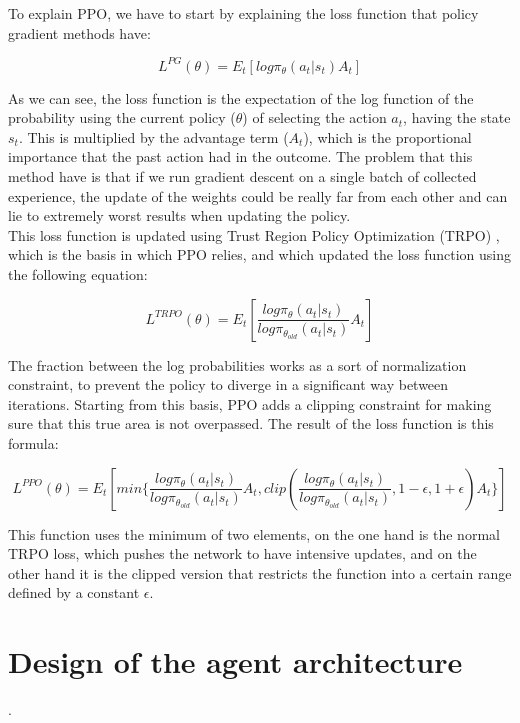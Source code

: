 \documentclass[12pt]{article}
\begin{document}
To explain PPO, we have to start by explaining the loss function that policy gradient methods have:

\begin{equation}
    L^{PG}(\theta) = E_t[log\pi_{\theta}(a_t|s_t)A_t]
\end{equation}

As we can see, the loss function is the expectation of the log function of the probability using the current policy ($\theta$) of selecting the action $a_t$, having the state $s_t$. This is multiplied by the advantage term ($A_t$), which is the proportional importance that the past action had in the outcome. The problem that this method have is that if we run gradient descent on a single batch of collected experience, the update of the weights could be really far from each other and can lie to extremely worst results when updating the policy. \\

This loss function is updated using Trust Region Policy Optimization (TRPO) \cite{schulman2015trust}, which is the basis in which PPO relies, and which updated the loss function using the following equation:

\begin{equation}
    L^{TRPO}(\theta) = E_t[\frac{log\pi_{\theta}(a_t|s_t)}{log\pi_{\theta_{old}}(a_t|s_t)}A_t]
    \label{ppo-loss}
\end{equation}

The fraction between the log probabilities works as a sort of normalization constraint, to prevent the policy to diverge in a significant way between iterations. Starting from this basis, PPO adds a clipping constraint for making sure that this true area is not overpassed. The result of the loss function is this formula:

\begin{equation}
    L^{PPO}(\theta) = E_t[min\{\frac{log\pi_{\theta}(a_t|s_t)}{log\pi_{\theta_{old}}(a_t|s_t)}A_t, clip(\frac{log\pi_{\theta}(a_t|s_t)}{log\pi_{\theta_{old}}(a_t|s_t)}, 1-\epsilon, 1+\epsilon)A_t\}]
\end{equation}

This function uses the minimum of two elements, on the one hand is the normal TRPO loss, which pushes the network to have intensive updates, and on the other hand it is the clipped version that restricts the function into a certain range defined by a constant $\epsilon$.

\section{Design of the agent architecture}.
\end{document}
